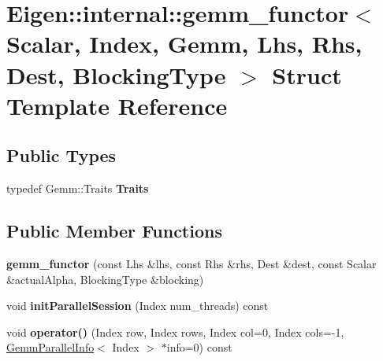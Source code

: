 \hypertarget{struct_eigen_1_1internal_1_1gemm__functor}{}\section{Eigen\+::internal\+::gemm\+\_\+functor$<$ Scalar, Index, Gemm, Lhs, Rhs, Dest, Blocking\+Type $>$ Struct Template Reference}
\label{struct_eigen_1_1internal_1_1gemm__functor}
\subsection*{Public Types}
\begin{DoxyCompactItemize}
\item 
\mbox{\label{struct_eigen_1_1internal_1_1gemm__functor_a5e2e68b3b5ffc8461b57a564dba32c50}} 
typedef Gemm\+::\+Traits {\bfseries Traits}
\end{DoxyCompactItemize}
\subsection*{Public Member Functions}
\begin{DoxyCompactItemize}
\item 
\mbox{\label{struct_eigen_1_1internal_1_1gemm__functor_ab6ef495befcff2df21dcd72b23c63d8b}} 
{\bfseries gemm\+\_\+functor} (const Lhs \&lhs, const Rhs \&rhs, Dest \&dest, const Scalar \&actual\+Alpha, Blocking\+Type \&blocking)
\item 
\mbox{\label{struct_eigen_1_1internal_1_1gemm__functor_a10901ca9388438219a91c0968e8118d9}} 
void {\bfseries init\+Parallel\+Session} (Index num\+\_\+threads) const
\item 
\mbox{\label{struct_eigen_1_1internal_1_1gemm__functor_adf335ccd5e878cddf3145d890c888ccb}} 
void {\bfseries operator()} (Index row, Index rows, Index col=0, Index cols=-\/1, \mbox{\hyperlink{struct_eigen_1_1internal_1_1_gemm_parallel_info}{Gemm\+Parallel\+Info}}$<$ Index $>$ $\ast$info=0) const
\end{DoxyCompactItemize}
